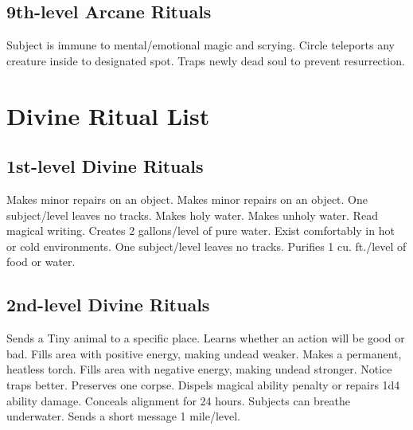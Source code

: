 \subsection{9th-level Arcane Rituals}
\begin{rituallist}
 Subject is immune to mental/emotional magic and scrying.
 Circle teleports any creature inside to designated spot.
\F Traps newly dead soul to prevent resurrection.
\end{rituallist}

\section{Divine Ritual List}
\subsection{1st-level Divine Rituals}
\begin{rituallist}
 Makes minor repairs on an object.
 Makes minor repairs on an object.
 One subject/level leaves no tracks.
 Makes holy water.
 Makes unholy water.
 Read magical writing.
 Creates 2 gallons/level of pure water.
 Exist comfortably in hot or cold environments.
 One subject/level leaves no tracks.
 Purifies 1 cu. ft./level of food or water.
\end{rituallist}

\subsection{2nd-level Divine Rituals}
\begin{rituallist}
 Sends a Tiny animal to a specific place.
\M\F Learns whether an action will be good or bad.
 Fills area with positive energy, making undead weaker.
 Makes a permanent, heatless torch.
 Fills area with negative energy, making undead stronger.
 Notice traps better.
 Preserves one corpse.
 Dispels magical ability penalty or repairs 1d4 ability damage.
 Conceals alignment for 24 hours.
 Subjects can breathe underwater.
 Sends a short message 1 mile/level.
\end{rituallist}

